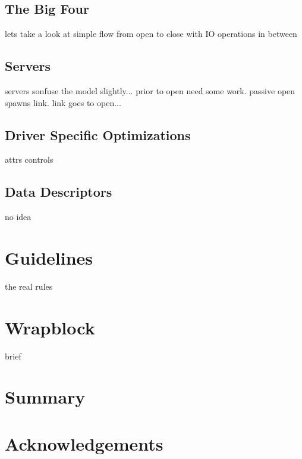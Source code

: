 \documentclass[11pt]{article}
\begin{document}
\subsection{The Big Four}
lets take a look at simple flow from open to close with IO operations in
between

\subsection{Servers}
servers sonfuse the model slightly... prior to open need some work.  passive
open spawns link.  link goes to open...

\subsection{Driver Specific Optimizations}
attrs
controls

\subsection{Data Descriptors}
no idea

\section{Guidelines}
the real rules

\section{Wrapblock}
brief

\section{Summary}

\section*{Acknowledgements}
\end{document}
